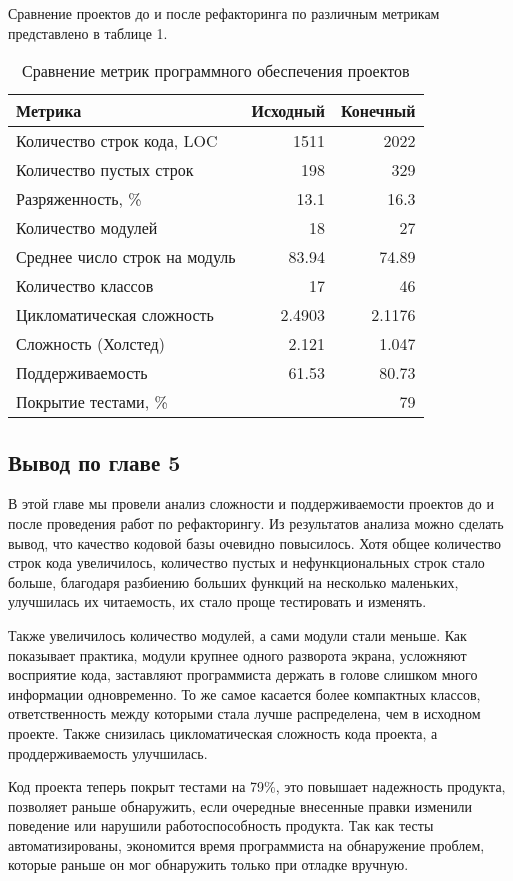     Сравнение проектов до и после рефакторинга по различным метрикам представлено в таблице 1.
    \begin{table}[H]
        \caption{Сравнение метрик программного обеспечения проектов}
        \begin{center}
            \begin{tabular}{l|r|r}
                \textbf{Метрика} & \textbf{Исходный} & \textbf{Конечный} \\
                \hline
                Количество строк кода, LOC    & 1511    & 2022 \\
                Количество пустых строк       & 198     & 329 \\
                Разряженность, \%             & 13.1    & 16.3 \\
                Количество модулей            & 18      & 27 \\
                Среднее число строк на модуль & 83.94   & 74.89 \\
                Количество классов            & 17      & 46 \\
                Цикломатическая сложность     & 2.4903  & 2.1176 \\
                Сложность (Холстед)           & 2.121   & 1.047 \\
                Поддерживаемость              & 61.53   & 80.73 \\
                Покрытие тестами, \%          &         & 79 \\
            \end{tabular}
        \end{center}
    \end{table}

    \subsection*{Вывод по главе 5}
    В этой главе мы провели анализ сложности и поддерживаемости проектов
    до и после проведения работ по рефакторингу. Из результатов анализа
    можно сделать вывод, что качество кодовой базы очевидно повысилось.
    Хотя общее количество строк кода увеличилось, количество пустых и
    нефункциональных строк стало больше, благодаря разбиению больших функций
    на несколько маленьких, улучшилась их читаемость, их стало проще тестировать
    и изменять.

    Также увеличилось количество модулей, а сами модули стали меньше.
    Как показывает практика, модули крупнее одного разворота экрана, усложняют
    восприятие кода, заставляют программиста держать в голове слишком много
    информации одновременно.
    То же самое касается более компактных классов, ответственность между которыми
    стала лучше распределена, чем в исходном проекте.
    Также снизилась цикломатическая сложность кода проекта, а проддерживаемость
    улучшилась.

    Код проекта теперь покрыт тестами на 79\%, это повышает надежность продукта,
    позволяет раньше обнаружить, если очередные внесенные правки
    изменили поведение или нарушили работоспособность продукта.
    Так как тесты автоматизированы, экономится время программиста на обнаружение
    проблем, которые раньше он мог обнаружить только при отладке вручную.
